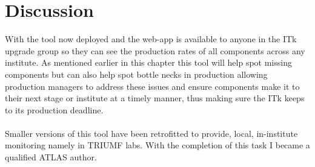 \section{Discussion}
With the tool now deployed and the web-app is available to anyone in the ITk upgrade group so they can see the production rates of all components across any institute. As mentioned earlier in this chapter this tool will help spot missing components but can also help spot bottle necks in production allowing production managers to address these issues and ensure components make it to their next stage or institute at a timely manner, thus making sure the ITk keeps to its production deadline. 
\\
\\
Smaller versions of this tool have been retrofitted to provide, local, in-institute monitoring namely in TRIUMF labs. With the completion of this task I became a qualified ATLAS author. 

